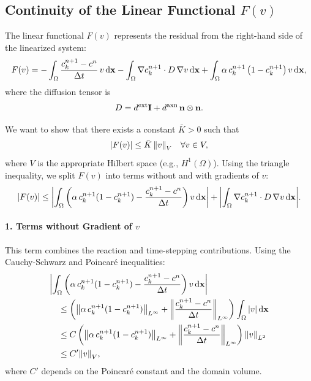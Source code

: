 \documentclass[12pt, a4paper, twoside, openright]{report}
\begin{document}
\subsection{Continuity of the Linear Functional $F(v)$}

The linear functional $F(v)$ represents the residual from the right-hand side of the linearized system:
\[
F(v) = - \int_{\Omega} \frac{c_k^{n+1} - c^n}{\Delta t} \, v \, \dd \vb{x} 
       - \int_{\Omega} \vb{\nabla} c_k^{n+1} \cdot D \, \vb{\nabla} v \, \dd \vb{x} 
       + \int_{\Omega} \alpha \, c_k^{n+1} \left(1 - c_k^{n+1}\right) v \, \dd \vb{x},
\]
where the diffusion tensor is
\[
D = d^{\mathrm{ext}} \mathbf{I} + d^{\mathrm{axn}} \, \vb{n} \otimes \vb{n}.
\]

We want to show that there exists a constant $\bar{K} > 0$ such that
\[
\abs{F(v)} \le \bar{K} \, \norm{v}_V \quad \forall v \in V,
\]
where $V$ is the appropriate Hilbert space (e.g., $H^1(\Omega)$). Using the triangle inequality, we split $F(v)$ into terms without and with gradients of $v$:
\[
\abs{F(v)} \le 
\abs{\int_{\Omega} \left( \alpha \, c_k^{n+1}(1 - c_k^{n+1}) - \frac{c_k^{n+1} - c^n}{\Delta t} \right) v \, \dd \vb{x}}
+
\abs{\int_{\Omega} \vb{\nabla} c_k^{n+1} \cdot D \, \vb{\nabla} v \, \dd \vb{x}}.
\]

\paragraph{1. Terms without Gradient of $v$} 
This term combines the reaction and time-stepping contributions. Using the Cauchy-Schwarz and Poincaré inequalities:
\begin{align*}
& \abs{\int_{\Omega} \left( \alpha \, c_k^{n+1}(1 - c_k^{n+1}) - \frac{c_k^{n+1} - c^n}{\Delta t} \right) v \, \dd \vb{x}} \\
&\quad \le \left( \norm{\alpha \, c_k^{n+1}(1 - c_k^{n+1})}_{L^\infty} + \norm{\frac{c_k^{n+1} - c^n}{\Delta t}}_{L^\infty} \right) \int_{\Omega} \abs{v} \, \dd \vb{x} \\
&\quad \le C \left( \norm{\alpha \, c_k^{n+1}(1 - c_k^{n+1})}_{L^\infty} + \norm{\frac{c_k^{n+1} - c^n}{\Delta t}}_{L^\infty} \right) \norm{v}_{L^2} \\
&\quad \le C' \norm{v}_V,
\end{align*}
where $C'$ depends on the Poincaré constant and the domain volume.
\end{document}
